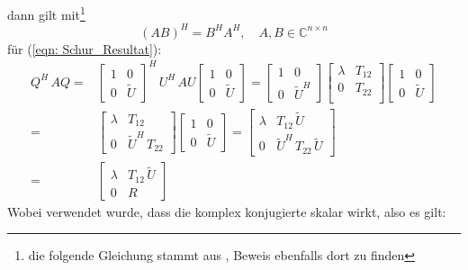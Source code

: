 \documentclass[a4paper,12pt]{report}
\newcommand{\C}{\mathbb C}
\newcommand{\klammer}[1]{\left(#1\right)}
\newcommand{\1}{\mathds{1}}
\theoremstyle{plain} %
\theoremstyle{definition} %
\theoremstyle{remark}
\begin{document}
            dann gilt mit\footnote{die folgende Gleichung stammt aus \cite{conjugateTranspose}, Beweis ebenfalls dort zu finden}
            \begin{equation}
                  \label{eqn: Produkt Adjungierter}
                  \klammer{AB}^H = B^HA^H,\quad A,B\in \C^{n\times n}
            \end{equation}
            für (\ref{eqn: Schur_Resultat}):
            $$\begin{aligned}
                  Q^H\,AQ =& \begin{bmatrix}
                        1&0\\
                        0&\widetilde U
                  \end{bmatrix}^H\,U^H\,AU \begin{bmatrix}
                        1&0\\
                        0&\widetilde U
                  \end{bmatrix} = \begin{bmatrix}
                        1&0\\
                        0&\widetilde U^H
                  \end{bmatrix}
                  \begin{bmatrix}
                        \lambda & T_{12} \\
                        0 & T_{22} \\
                  \end{bmatrix}
                  \begin{bmatrix}
                        1&0\\
                        0&\widetilde U
                  \end{bmatrix}\\
                  =& \begin{bmatrix}
                        \lambda&T_{12}\\
                        0&\widetilde U^H\, T_{22}
                  \end{bmatrix}
                  \begin{bmatrix}
                        1&0\\
                        0&\widetilde U
                  \end{bmatrix}
                  = \begin{bmatrix}
                        \lambda&T_{12}\,\widetilde U\\
                        0&\widetilde U^H\, T_{22}\, \widetilde U
                  \end{bmatrix}\\
                  =& \begin{bmatrix}
                        \lambda&T_{12}\,\widetilde U\\
                        0&R
                  \end{bmatrix}
            \end{aligned}$$
            Wobei verwendet wurde, dass die komplex konjugierte skalar wirkt, also es gilt:
           
\end{document}
